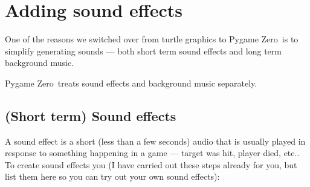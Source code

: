 \documentclass{coderdojo}
\def\pygameZero{{\pygameZeroFont Pygame Zero}}
\begin{document}
\section{Adding sound effects}\label{sec:rectangle}

One of the reasons we switched over from turtle graphics to \pygameZero\ is to simplify generating sounds --- both short term sound effects and long term background music. 

\pygameZero\ treats sound effects and background music separately. 

\subsection{(Short term) Sound effects}

A sound effect is a short (less than a few seconds) audio that is usually played in response to something happening in a game --- target was hit, player died, etc.. To create sound effects you (I have carried out these steps already for you, but list them here so you can try out your own sound effects):
\end{document}
